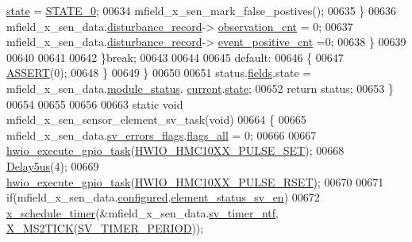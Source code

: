 \begin{DoxyCode}
      \hyperlink{a00019_a6b8d8e916bc56265a3fd279bd26b6d1b}{state} = \hyperlink{a00021_ad6739dbbe5581cac99b7dc8a5e09949c}{STATE\_0};
00634                      mfield\_x\_sen\_mark\_false\_postives();
00635                  \}
00636                            mfield\_x\_sen\_data.\hyperlink{a00025_ac9b38e2c1d3f1013a88d33506c754152}{disturbance\_record}->
      \hyperlink{a00028_ad5b0bac02ce266b91b2b52a1c3ea1d78}{observation\_cnt}     = 0;
00637                            mfield\_x\_sen\_data.\hyperlink{a00025_ac9b38e2c1d3f1013a88d33506c754152}{disturbance\_record}->
      \hyperlink{a00028_a7397b9d76d4b57500f27bb23d258a18a}{event\_positive\_cnt}   =0;
00638                 \}
00639 
00640 
00641 
00642         \}\textcolor{keywordflow}{break};
00643 
00644 
00645         \textcolor{keywordflow}{default}:
00646         \{
00647             \hyperlink{a00072_abb8ff8e213ac9f6fb21d2b968583b936}{ASSERT}(0);
00648         \}
00649     \}
00650 
00651     status.\hyperlink{a00021_a5296d090c085b0421fdf5a86e382abea}{fields}.state = mfield\_x\_sen\_data.\hyperlink{a00025_adfab5a5d8b45a93dfb13edb24e2b80e3}{module\_status}.
      \hyperlink{a00019_acf41ffc11da291c2f9f0fcb02ee72b98}{current}.\hyperlink{a00019_a6b8d8e916bc56265a3fd279bd26b6d1b}{state};
00652     \textcolor{keywordflow}{return} status;
00653 \}
00654 
00655 
00656 
00663 \textcolor{keyword}{static} \textcolor{keywordtype}{void} mfield\_x\_sen\_sensor\_element\_sv\_task(\textcolor{keywordtype}{void})
00664 \{
00665         mfield\_x\_sen\_data.\hyperlink{a00025_aaeec6b0609dba31393f337abf1cce3d3}{sv\_errors\_flags}.\hyperlink{a00022_a1caa87b00c878186140c3bac9c8acf3b}{flags\_all} = 0;
00666         
00667         \hyperlink{a00058_a0af9eae455fbdf4e77def5bfffa109cb}{hwio\_execute\_gpio\_task}(\hyperlink{a00058_a6e93f09b80c1e730d60fbce52cc29818}{HWIO\_HMC10XX\_PULSE\_SET});
00668         \hyperlink{a00033_a3b0017f6ec0e04a6435bba00fe325294}{Delay5us}(4);
00669         \hyperlink{a00058_a0af9eae455fbdf4e77def5bfffa109cb}{hwio\_execute\_gpio\_task}(\hyperlink{a00058_ac5506797b126d9ef0f4495c899fb6ef6}{HWIO\_HMC10XX\_PULSE\_RSET});
00670 
00671         \textcolor{keywordflow}{if}(mfield\_x\_sen\_data.\hyperlink{a00025_a94b2d1f6ea4ab334c74d24984dd27843}{configured}.\hyperlink{a00021_afeb3f74725269028a60926f98890c22b}{element\_status\_sv\_en})
00672         \hyperlink{a00036_a9e3befaa21e83f196f74201deed85346}{x\_schedule\_timer}(&mfield\_x\_sen\_data.\hyperlink{a00025_ada91b200053f2d93e3639dc4ee3415b4}{sv\_timer\_ntf},
      \hyperlink{a00036_a1732cd929c486b3a225824bb2b3dba36}{X\_MS2TICK}(\hyperlink{a00023_a8a535456285f4602701c814d7b69cc68}{SV\_TIMER\_PERIOD}));

\end{DoxyCode}
